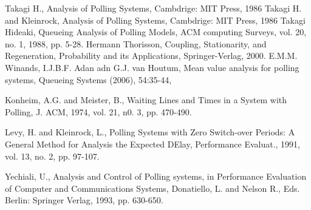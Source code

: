 \begin{thebibliography}{99}
 Takagi H., Analysis of Polling Systems, Cambdrige: MIT Press, 1986
 Takagi H. and Kleinrock, Analysis of Polling Systems, Cambdrige:
MIT Press, 1986
Takagi Hideaki, Queueing Analysis of Polling Models, ACM computing Surveys, vol. 20, no. 1, 1988, pp. 5-28.
 Hermann Thorisson, Coupling, Stationarity, and Regeneration, Probability and its Applications, Springer-Verlag, 2000.
 E.M.M. Winands, I.J.B.F. Adan adn G.J. van Houtum, Mean value analysis for polling systems,
Queueing Systems (2006), 54:35-44,



 Konheim, A.G. and Meister, B., Waiting Lines and Times in a System with Polling, J. ACM, 1974, vol. 21, n0. 3, pp. 470-490.

Levy, H. and Kleinrock, L., Polling Systems with Zero Switch-over Periods: A General Method for Analysis the Expected DElay, Performance Evaluat., 1991, vol. 13, no. 2, pp. 97-107.


 Yechiali, U., Analysis and Control of Polling
systems, in Performance Evaluation of Computer and Communications
Systems, Donatiello, L. and Nelson R., Eds. Berlin: Springer
Verlag, 1993, pp. 630-650.
\end{thebibliography}
